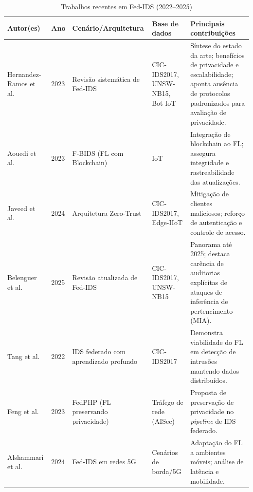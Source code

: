 \documentclass[
	12pt,				%
	openright,			%
	oneside,			%
	a4paper,			%
	english,			%
	french,				%
	spanish,			%
	brazil,				%
	]{abntex2}
\begin{document}
\begin{table}[H]
\centering
\footnotesize
\caption{Trabalhos recentes em Fed-IDS (2022–2025)}
\label{tab:fed_ids_recentes}
\begin{tabular}{p{3.2cm}p{1.2cm}p{3.0cm}p{2.8cm}p{5.0cm}}
\toprule
\textbf{Autor(es)} & \textbf{Ano} & \textbf{Cenário/Arquitetura} & \textbf{Base de dados} & \textbf{Principais contribuições} \\
\midrule
Hernandez-Ramos et al. \cite{hernandez2023surveyfedids} & 2023 & Revisão sistemática de Fed-IDS & CIC-IDS2017, UNSW-NB15, Bot-IoT & Síntese do estado da arte; benefícios de privacidade e escalabilidade; aponta ausência de protocolos padronizados para avaliação de privacidade. \\
Aouedi et al. \cite{aouedi2023blockchainids} & 2023 & F-BIDS (FL com Blockchain) & IoT & Integração de blockchain ao FL; assegura integridade e rastreabilidade das atualizações. \\
Javeed et al. \cite{javeed2024zerotrust} & 2024 & Arquitetura Zero-Trust & CIC-IDS2017, Edge-IIoT & Mitigação de clientes maliciosos; reforço de autenticação e controle de acesso. \\
Belenguer et al. \cite{belenguer2025surveyfedids} & 2025 & Revisão atualizada de Fed-IDS & CIC-IDS2017, UNSW-NB15 & Panorama até 2025; destaca carência de auditorias explícitas de ataques de inferência de pertencimento (MIA). \\
Tang et al. \cite{tang2022fedids} & 2022 & IDS federado com aprendizado profundo & CIC-IDS2017 & Demonstra viabilidade do FL em detecção de intrusões mantendo dados distribuídos. \\
Feng et al. \cite{feng2023fedphp} & 2023 & FedPHP (FL preservando privacidade) & Tráfego de rede (AISec) & Proposta de preservação de privacidade no \textit{pipeline} de IDS federado. \\
Alshammari et al. \cite{alshammari2024springerids} & 2024 & Fed-IDS em redes 5G & Cenários de borda/5G & Adaptação do FL a ambientes móveis; análise de latência e mobilidade. \\

\end{tabular}
\end{table}
\end{document}
